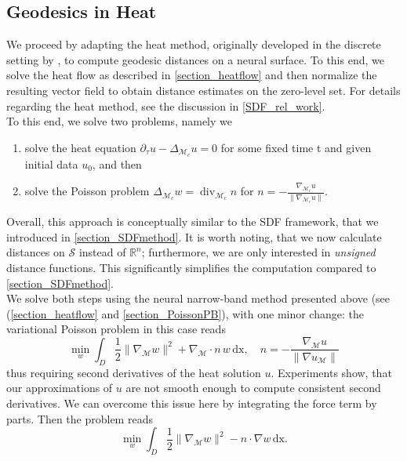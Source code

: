 \documentclass[12pt,openany]{book}
\newcommand{\R}{\mathbb{R}}
\def\S{\mathcal{S}}
\theoremstyle{plainnormal}
\theoremstyle{remark}
\begin{document}
\subsection{Geodesics in Heat}
We proceed by adapting the heat method, originally developed in the discrete setting by \cite{Crane_2013}, to compute geodesic distances on a neural surface. To this end, we solve the heat flow as described in \cref{section_heatflow} and then normalize the resulting vector field to obtain distance estimates on the zero-level set. For details regarding the heat method, see the discussion in \cref{SDF_rel_work}. \\
To this end, we solve two problems, namely we
\begin{enumerate}
    \item solve the heat equation $\partial_\tau u - \Delta_{\mathcal{M}_c} u = 0$ for some fixed time t and given initial data $u_0$, and then
    \item solve the Poisson problem $\Delta_{\mathcal{M}_c} w = \operatorname{div}_{\mathcal{M}_c}  n$ for $ n = -\frac{\nabla_{\mathcal{M}_c} u}{\|\nabla_{\mathcal{M}_c} u\|}$.
\end{enumerate}
Overall, this approach is conceptually similar to the SDF framework, that we introduced in \cref{section_SDFmethod}. 
It is worth noting, that we now calculate distances on $\S$ instead of $\R^n$; furthermore, we are only interested in \emph{unsigned} distance functions. This significantly simplifies the computation compared to \cref{section_SDFmethod}.\\
We solve both steps using the neural narrow-band method presented above (see (\cref{section_heatflow} and \cref{section_PoissonPB}), with one minor change: the variational Poisson problem in this case reads 
$$\min_w\int_D \frac{1}{2}\|\nabla_\mathcal{M}w\|^2 + \nabla_{\mathcal{M}} \cdot n \, w \,\mathrm{dx}, \quad n = - \frac{\nabla_{\mathcal{M}} u}{\|\nabla u_{\mathcal{M}}\|}$$
thus requiring second derivatives of the heat solution $u$. Experiments show, that our approximations of $u$ are not smooth enough to compute consistent second derivatives. We can overcome this issue here by integrating the force term by parts. Then the problem reads 
$$\min_w\int_D \frac{1}{2}\|\nabla_\mathcal{M}w\|^2 - n\cdot \nabla w \,\mathrm{dx}.$$
\end{document}
